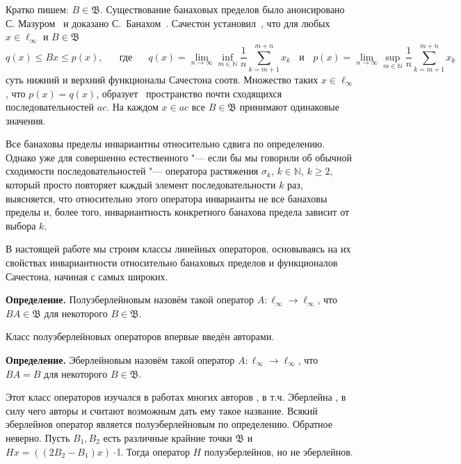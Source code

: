 \documentclass[a4paper,14pt]{article}
\begin{document}
	Кратко пишем: $B \in \mathfrak{B}$.
	Существование банаховых пределов было анонсировано С. Мазуром~\cite{Mazur} и доказано С.~Банахом~\cite{banach1993theorie}.
	Сачестон установил~\cite{sucheston1967banach}, что
	для любых $x\in \ell_\infty$ и $B\in\mathfrak{B}$
	\begin{equation*}\label{Sucheston}
		q(x) \leqslant Bx \leqslant p(x)
		,
		\quad\mbox{~~где~~}\quad
		q(x) = \lim_{n\to\infty} \inf_{m\in\mathbb{N}}  \frac{1}{n} \sum_{k=m+1}^{m+n} x_k
		~~~~\mbox{и}~~~~
		p(x) = \lim_{n\to\infty} \sup_{m\in\mathbb{N}}  \frac{1}{n} \sum_{k=m+1}^{m+n} x_k
	\end{equation*}
	суть нижний и верхний функционалы Сачестона соотв.
	Множество таких $x\in\ell_\infty$, что $p(x)=q(x)$,
	образует~\cite{lorentz1948contribution} пространство почти сходящихся последовательностей $ac$.
	На каждом $x\in ac$ все $B\in \mathfrak{B}$ принимают одинаковые значения.

	Все банаховы пределы инвариантны относительно сдвига по определению.
	Однако уже для совершенно естественного "--- если бы мы говорили об обычной сходимости последовательностей "---
	оператора растяжения $\sigma_k$, $k\in \mathbb N$, $k\ge2$, который просто повторяет каждый элемент последовательности $k$ раз,
	выясняется, что относительно этого оператора инварианты не все банаховы пределы и,
	более того, инвариантность конкретного банахова предела зависит от выбора $k$.

	В настоящей работе мы строим классы линейных операторов,
	основываясь на их свойствах инвариантности относительно банаховых пределов и функционалов Сачестона,
	начиная с самых широких.

	\textbf{Определение.}
	Полуэберлейновым назовём такой оператор $A:\ell_\infty \to \ell_\infty$,
	что $BA\in\mathfrak B$ для некоторого $B\in\mathfrak B$.

	Класс полуэберлейновых операторов впервые введён авторами.

	\textbf{Определение.}
	Эберлейновым назовём такой оператор $A:\ell_\infty \to \ell_\infty$,
	что $BA=B$ для некоторого $B\in\mathfrak B$.

	Этот класс операторов изучался в работах многих авторов
	\cite{semenov2010invariant,ASSU2,semenov2019main},
	в т.ч. Эберлейна
	\cite{eberlein1950banach},
	в силу чего авторы и считают возможным дать ему такое название.
	Всякий эберлейнов оператор является полуэберлейновым по определению.
	Обратное неверно.
	Пусть $B_1, B_2$ есть различные крайние точки $ \mathfrak B$
	и $Hx = ((2B_2-B_1) x) \cdot\mathbb I$.
	Тогда оператор $H$ полуэберлейнов,
	но не эберлейнов.
\end{document}
